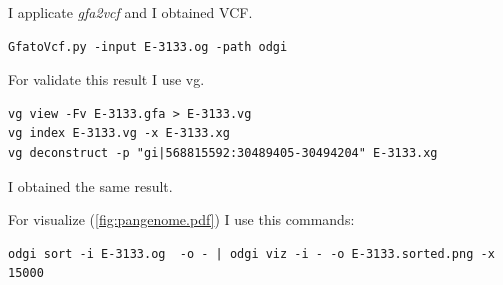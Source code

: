 \begin{itemize}
I applicate \textit{gfa2vcf} and I obtained VCF.

\begin{verbatim}
GfatoVcf.py -input E-3133.og -path odgi
\end{verbatim}

For validate this result I use vg.

\begin{verbatim}
vg view -Fv E-3133.gfa > E-3133.vg
vg index E-3133.vg -x E-3133.xg
vg deconstruct -p "gi|568815592:30489405-30494204" E-3133.xg 
\end{verbatim}

I obtained the same result. 

For visualize (\ref{fig:pangenome.pdf}) I use this commands:

\begin{verbatim}
odgi sort -i E-3133.og  -o - | odgi viz -i - -o E-3133.sorted.png -x 15000
\end{verbatim}
\end{itemize}

  


